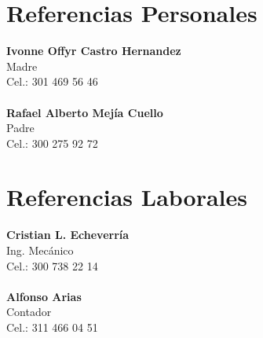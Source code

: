 \documentclass[11pt,letterpaper,sans]{moderncv}
\begin{document}
	
	\newpage
	
	\section{Referencias Personales}
	\textbf{Ivonne Offyr Castro Hernandez}\\
	Madre\\
	Cel.: 301 469 56 46\\
	\\
	\textbf{Rafael Alberto Mejía Cuello}\\
	Padre\\
	Cel.: 300 275 92 72\\
	\section{Referencias Laborales}
	\textbf{Cristian L. Echeverría}\\
	Ing. Mecánico\\
	Cel.: 300 738 22 14\\
	\\
	\textbf{Alfonso Arias}\\
	Contador\\
	Cel.: 311 466 04 51\\
	
	
\end{document}
